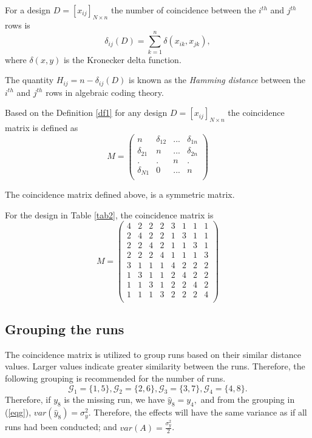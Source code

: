 \documentclass[twoside]{article}
\begin{document}
 \begin{dfn}\label{df1}
For a design $D=[x_{ij}]_{N \times n}$ the number of coincidence between the $i^{th}$ and $j^{th}$ rows is 
$$\delta_{ij}(D)=\sum_{k=1}^n \delta(x_{ik},x_{jk}),$$
where $\delta(x,y)$ is the Kronecker delta function.
\end{dfn}
\begin{rem}\label{rm2}
The quantity $H_{ij}=n - \delta_{ij}(D)$ is known as the {\it Hamming distance} between the $i^{th}$ and $j^{th}$ rows in algebraic coding theory. 
\end{rem}
\begin{dfn}\label{df2}
Based on the Definition \ref{df1} for any design $D=[x_{ij}]_{N \times n}$ the coincidence matrix is defined as
\[M= 
\begin{pmatrix} 
n & \delta_{12} & ... & \delta_{1n}\\
\delta_{21}& n & ... & \delta_{2n}\\
. & . & n  & .\\
\delta_{N1}& 0 & ... & n\\
\end{pmatrix}
\]
\end{dfn}
\begin{rem}
The coincidence matrix defined above, is a symmetric matrix. 
\end{rem}
\begin{eg}\label{ex1}
For the design in Table \ref{tab2}, the coincidence matrix is
\[M= 
\begin{pmatrix} 
4 & 2 & 2 & 2 & 3 &  1 & 1 & 1\\
2 & 4 & 2 & 2 & 1 &  3 & 1 & 1\\
2 & 2 & 4 & 2 & 1 &  1 & 3 & 1\\
2 & 2 & 2 & 4 & 1 &  1 & 1 & 3\\
3 & 1 & 1 & 1 & 4 &  2 & 2 & 2\\
1 & 3 & 1 & 1 & 2 &  4 & 2 & 2\\
1 & 1 & 3 & 1 & 2 &  2 & 4 & 2\\
1 & 1 & 1 & 3 & 2 &  2 & 2 & 4\\
\end{pmatrix}
\]
\end{eg} 

\subsection{Grouping the runs}
The coincidence matrix is utilized to group runs based on their similar distance values. Larger values indicate greater similarity between the runs. Therefore, the following grouping is recommended for the number of runs.
\begin{equation}\label{eqg}
\mathcal{G}_1=\lbrace 1, 5 \rbrace, \mathcal{G}_2=\lbrace 2, 6 \rbrace, \mathcal{G}_3=\lbrace 3, 7 \rbrace, \mathcal{G}_4=\lbrace 4, 8 \rbrace. 
\end{equation}
Therefore, if $y_8$ is the missing run, we have
$\hat{y}_8=y_4,$
and from the grouping in (\ref{eqg}), $var(\hat{y}_8)=\sigma^2_y$. Therefore, the effects will have the same variance as if all runs had been conducted; and $var(A)=\frac{\sigma^2_y}{2}$. 
\end{document}
